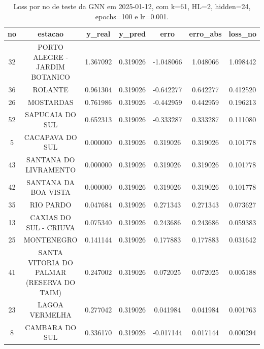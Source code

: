 \begin{table}[h]
\centering
\caption{Loss por no de teste da GNN em 2025-01-12, com k=61, HL=2, hidden=24, epochs=100 e lr=0.001.}
\label{tab:gnn_loss_k61_hl2_h24_e100_d20250112}
\begin{tabular}{ccccccc}
\toprule
no & estacao & y\_real & y\_pred & erro & erro\_abs & loss\_no \\
\midrule
32 & PORTO ALEGRE - JARDIM BOTANICO & 1.367092 & 0.319026 & -1.048066 & 1.048066 & 1.098442 \\
36 & ROLANTE & 0.961304 & 0.319026 & -0.642277 & 0.642277 & 0.412520 \\
26 & MOSTARDAS & 0.761986 & 0.319026 & -0.442959 & 0.442959 & 0.196213 \\
52 & SAPUCAIA DO SUL & 0.652313 & 0.319026 & -0.333287 & 0.333287 & 0.111080 \\
5 & CACAPAVA DO SUL & 0.000000 & 0.319026 & 0.319026 & 0.319026 & 0.101778 \\
43 & SANTANA DO LIVRAMENTO & 0.000000 & 0.319026 & 0.319026 & 0.319026 & 0.101778 \\
42 & SANTANA DA BOA VISTA & 0.000000 & 0.319026 & 0.319026 & 0.319026 & 0.101778 \\
35 & RIO PARDO & 0.047684 & 0.319026 & 0.271343 & 0.271343 & 0.073627 \\
13 & CAXIAS DO SUL - CRIUVA & 0.075340 & 0.319026 & 0.243686 & 0.243686 & 0.059383 \\
25 & MONTENEGRO & 0.141144 & 0.319026 & 0.177883 & 0.177883 & 0.031642 \\
41 & SANTA VITORIA DO PALMAR (RESERVA DO TAIM) & 0.247002 & 0.319026 & 0.072025 & 0.072025 & 0.005188 \\
23 & LAGOA VERMELHA & 0.277042 & 0.319026 & 0.041984 & 0.041984 & 0.001763 \\
8 & CAMBARA DO SUL & 0.336170 & 0.319026 & -0.017144 & 0.017144 & 0.000294 \\
\bottomrule
\end{tabular}
\end{table}
